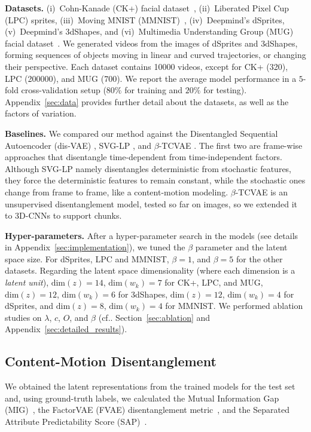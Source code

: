 \documentclass[journal]{IEEEtran}
\makeatletter
\DeclareRobustCommand\onedot{\futurelet\@let@token\@onedot}
\def\@onedot{\ifx\@let@token.\else.\null\fi\xspace}
\def\cf{{cf}\onedot} \def\Cf{{Cf}\onedot}
\makeatother
\begin{document}
\textbf{Datasets.}
(i)~Cohn-Kanade (CK+) facial dataset~\cite{Kanade2000, Lucey2010}, (ii)~Liberated Pixel Cup (LPC) sprites, (iii)~Moving MNIST (MMNIST)~\cite{Srivastava2015}, (iv)~Deepmind's dSprites, (v)~Deepmind's 3dShapes, and (vi)~Multimedia Understanding Group (MUG) facial dataset~\cite{Aifanti2010}.
We generated videos from the images of dSprites and 3dShapes, forming sequences of objects moving in linear and curved trajectories, or changing their perspective.
Each dataset contains \num{10000} videos, except for CK+ (\num{320}), LPC (\num{200000}), and MUG (\num{700}).
We report the average model performance in a $5$-fold cross-validation setup ($80\%$ for training and $20\%$ for testing).
Appendix~\ref{sec:data} provides further detail about the datasets, as well as the factors of variation.

\textbf{Baselines.}
We compared our method against the Disentangled Sequential Autoencoder (dis-VAE) \cite{Li2018}, SVG-LP \cite{Denton2018}, and $\beta$-TCVAE \cite{Chen2018dr}.
The first two are frame-wise approaches that disentangle time-dependent from time-independent factors.
Although SVG-LP namely disentangles deterministic from stochastic features, they force the deterministic features to remain constant, while the stochastic ones change from frame to frame, like a content-motion modeling.
$\beta$-TCVAE is an unsupervised disentanglement model, tested so far on images, so we extended it to 3D-CNNs to support chunks.

\textbf{Hyper-parameters.}
After a hyper-parameter search in the models (see details in Appendix~\ref{sec:implementation}), we tuned the $\beta$ parameter and the latent space size.
For dSprites, LPC and MMNIST, $\beta = 1$, and $\beta = 5$ for the other datasets.
Regarding the latent space dimensionality (where each dimension is a \textit{latent unit}), $\text{dim}(z)=14$, $\text{dim}(w_k)=7$ for CK+, LPC, and MUG, $\text{dim}(z)=12$, $\text{dim}(w_k)=6$ for 3dShapes, $\text{dim}(z)=12$, $\text{dim}(w_k)=4$ for dSprites, and $\text{dim}(z)=8$, $\text{dim}(w_k)=4$ for MMNIST.
We performed ablation studies on $\lambda$, $c$, $O$, and $\beta$ (\cf Section~\ref{sec:ablation} and Appendix~\ref{sec:detailed_results}).

\subsection{Content-Motion Disentanglement}
\label{sec:experiments_disentanglement}

We obtained the latent representations from the trained models for the test set and, using ground-truth labels, we calculated the Mutual Information Gap (MIG)~\cite{Chen2018dr}, the FactorVAE (FVAE) disentanglement metric~\cite{Kim2018}, and the Separated Attribute Predictability Score (SAP)~\cite{Kumar2018}.
\end{document}
